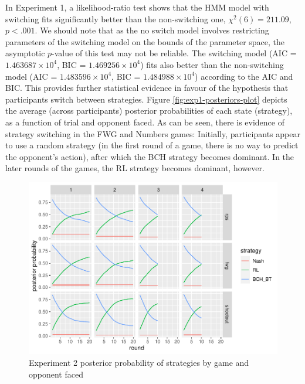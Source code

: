 \documentclass[smallextended]{svjour3}       %
\begin{document}
In Experiment 1, a likelihood-ratio test shows that the HMM model with
switching fits significantly better than the non-switching one,
\(\chi^2(6) = 211.09\), \(p < .001\). We should note that as the no
switch model involves restricting parameters of the switching model on
the bounds of the parameter space, the asymptotic \(p\)-value of this
test may not be reliable. The switching model (AIC =
\ensuremath{1.463687\times 10^{4}}, BIC =
\ensuremath{1.469256\times 10^{4}}) fits also better than the
non-switching model (AIC = \ensuremath{1.483596\times 10^{4}}, BIC =
\ensuremath{1.484988\times 10^{4}}) according to the AIC and BIC. This
provides further statistical evidence in favour of the hypothesis that
participants switch between strategies. Figure
\ref{fig:exp1-posteriors-plot} depicts the average (across participants)
posterior probabilities of each state (strategy), as a function of trial
and opponent faced. As can be seen, there is evidence of strategy
switching in the FWG and Numbers games: Initially, participants appear
to use a random strategy (in the first round of a game, there is no way
to predict the opponent's action), after which the BCH strategy becomes
dominant. In the later rounds of the games, the RL strategy becomes
dominant, however.

\begin{figure}

{\centering \includegraphics[width=\textwidth]{CBB_files/figure-latex/exp2-posteriors-plot-1} 

}

\caption{Experiment 2 posterior probability of strategies by game and opponent faced}\label{fig:exp2-posteriors-plot}
\end{figure}
\end{document}
